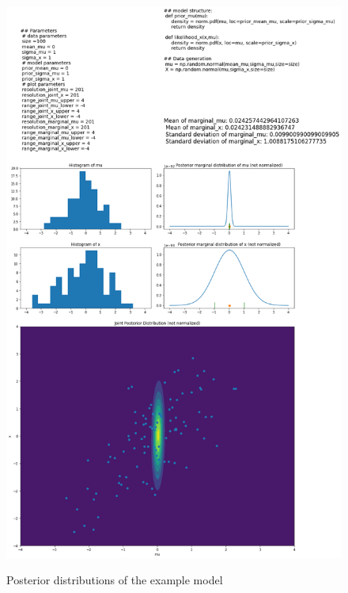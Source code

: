 \documentclass{article}
\begin{document}
\begin{figure}
	\includegraphics[width=\textwidth]{images/ground_truth_posterior_1.png}
	\label{fig:ground_truth_posterior_1}
	\caption[Posterior distributions of the example model]{Posterior distributions of the example model}
\end{figure}
\end{document}

